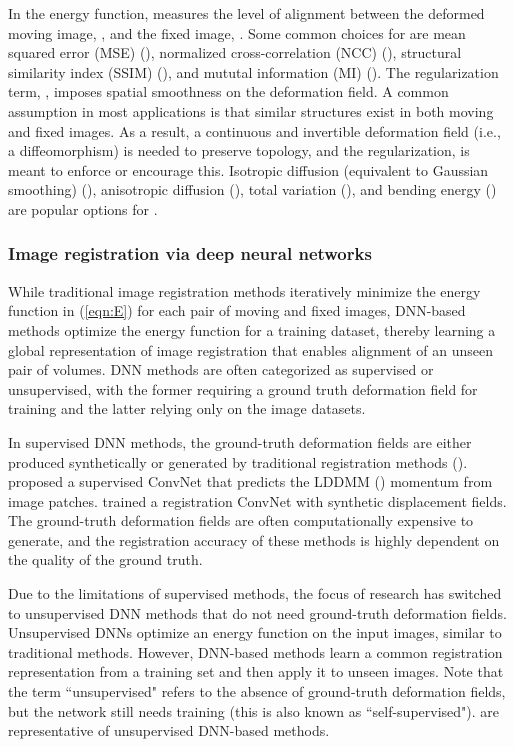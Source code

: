 \documentclass[times,twocolumn,final]{elsarticle}
\begin{document}
In the energy function,  measures the level of alignment between the deformed moving image, , and the fixed image, . Some common choices for  are mean squared error (MSE) (\cite{beg2005computing, wolberg2000robust}), normalized cross-correlation (NCC) (\cite{avants2008symmetric}), structural similarity index (SSIM) (\cite{chen2020generating}), and mututal information (MI) (\cite{viola1997alignment}). The regularization term, , imposes spatial smoothness on the deformation field. A common assumption in most applications is that similar structures exist in both moving and fixed images. As a result, a continuous and invertible deformation field (i.e., a diffeomorphism) is needed to preserve topology, and the regularization,  is meant to enforce or encourage this. Isotropic diffusion (equivalent to Gaussian smoothing) (\cite{balakrishnan2019voxelmorph}), anisotropic diffusion (\cite{pace2013locally}), total variation (\cite{vishnevskiy2016isotropic}), and bending energy (\cite{johnson2002consistent}) are popular options for .

\subsubsection{Image registration via deep neural networks}
While traditional image registration methods iteratively minimize the energy function in (\ref{eqn:E}) for each pair of moving and fixed images, DNN-based methods optimize the energy function for a training dataset, thereby learning a global representation of image registration that enables alignment of an unseen pair of volumes. DNN methods are often categorized as supervised or unsupervised, with the former requiring a ground truth deformation field for training and the latter relying only on the image datasets. 

In supervised DNN methods, the ground-truth deformation fields are either produced synthetically or generated by traditional registration methods (\cite{yang2017quicksilver, sokooti2017nonrigid, cao2018deep}). \cite{yang2017quicksilver} proposed a supervised ConvNet that predicts the LDDMM (\cite{beg2005computing}) momentum from image patches. \cite{sokooti2017nonrigid} trained a registration ConvNet with synthetic displacement fields. The ground-truth deformation fields are often computationally expensive to generate, and the registration accuracy of these methods is highly dependent on the quality of the ground truth.

Due to the limitations of supervised methods, the focus of research has switched to unsupervised DNN methods that do not need ground-truth deformation fields. Unsupervised DNNs optimize an energy function on the input images, similar to traditional methods. However, DNN-based methods learn a common registration representation from a training set and then apply it to unseen images. Note that the term ``unsupervised" refers to the absence of ground-truth deformation fields, but the network still needs training (this is also known as ``self-supervised"). \cite{de2019deep, balakrishnan2018unsupervised, balakrishnan2019voxelmorph} are representative of unsupervised DNN-based methods.
\end{document}
